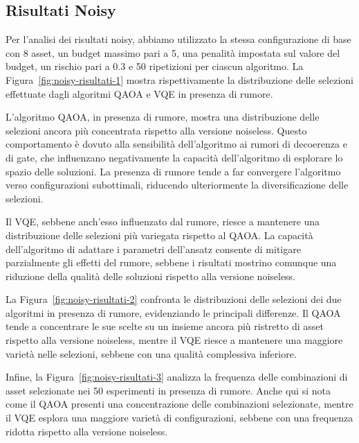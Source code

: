 \subsection{Risultati Noisy}

Per l'analisi dei risultati noisy, abbiamo utilizzato la stessa configurazione 
di base con 8 asset, un budget massimo pari a 5, una penalità impostata sul valore 
del budget, un rischio pari a 0.3 e 50 ripetizioni per ciascun algoritmo. 
La Figura~\ref{fig:noisy-risultati-1} mostra rispettivamente la distribuzione 
delle selezioni effettuate dagli algoritmi QAOA e VQE in presenza di rumore.

L'algoritmo QAOA, in presenza di rumore, mostra una distribuzione delle selezioni 
ancora più concentrata rispetto alla versione noiseless. Questo comportamento 
è dovuto alla sensibilità dell'algoritmo ai rumori di decoerenza e di gate, 
che influenzano negativamente la capacità dell'algoritmo di esplorare lo spazio 
delle soluzioni. La presenza di rumore tende a far convergere l'algoritmo verso 
configurazioni subottimali, riducendo ulteriormente la diversificazione delle selezioni.

Il VQE, sebbene anch'esso influenzato dal rumore, riesce a mantenere una 
distribuzione delle selezioni più variegata rispetto al QAOA. La capacità 
dell'algoritmo di adattare i parametri dell'ansatz consente di mitigare 
parzialmente gli effetti del rumore, sebbene i risultati mostrino comunque 
una riduzione della qualità delle soluzioni rispetto alla versione noiseless.

La Figura~\ref{fig:noisy-risultati-2} confronta le distribuzioni delle selezioni 
dei due algoritmi in presenza di rumore, evidenziando le principali differenze. 
Il QAOA tende a concentrare le sue scelte su un insieme ancora più ristretto di asset 
rispetto alla versione noiseless, mentre il VQE riesce a mantenere una maggiore 
varietà nelle selezioni, sebbene con una qualità complessiva inferiore.

Infine, la Figura~\ref{fig:noisy-risultati-3} analizza la frequenza delle combinazioni 
di asset selezionate nei 50 esperimenti in presenza di rumore. Anche qui si nota come 
il QAOA presenti una concentrazione delle combinazioni selezionate, mentre il VQE 
esplora una maggiore varietà di configurazioni, sebbene con una frequenza ridotta 
rispetto alla versione noiseless.

